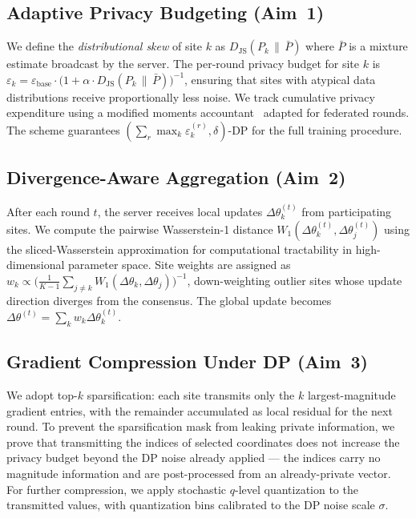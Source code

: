\documentclass[11pt,a4paper]{article}
\begin{document}
{\subsection{Adaptive Privacy Budgeting (Aim~1)}

We define the \emph{distributional skew} of site $k$ as
$D_{\mathrm{JS}}(P_k \,\|\, \bar{P})$ where $\bar{P}$ is a mixture estimate broadcast by the
server. The per-round privacy budget for site $k$ is
$\varepsilon_k = \varepsilon_{\mathrm{base}} \cdot \bigl(1 +
\alpha \cdot D_{\mathrm{JS}}(P_k \,\|\, \bar{P})\bigr)^{-1}$, ensuring that sites with
atypical data distributions receive proportionally less noise. We track cumulative privacy
expenditure using a modified moments accountant~\cite{abadi2016} adapted for federated
rounds. The scheme guarantees $(\sum_r \max_k \varepsilon_k^{(r)}, \delta)$-DP for the full
training procedure.

\subsection{Divergence-Aware Aggregation (Aim~2)}

After each round $t$, the server receives local updates $\Delta\theta_k^{(t)}$ from
participating sites. We compute the pairwise Wasserstein-1 distance
$W_1(\Delta\theta_k^{(t)}, \Delta\theta_j^{(t)})$ using the sliced-Wasserstein approximation
for computational tractability in high-dimensional parameter space. Site weights are
assigned as $w_k \propto \bigl(\frac{1}{K-1}\sum_{j \neq k} W_1(\Delta\theta_k,
\Delta\theta_j)\bigr)^{-1}$, down-weighting outlier sites whose update direction diverges
from the consensus. The global update becomes
$\Delta\theta^{(t)} = \sum_k w_k \Delta\theta_k^{(t)}$.

\subsection{Gradient Compression Under DP (Aim~3)}

We adopt top-$k$ sparsification: each site transmits only the $k$ largest-magnitude gradient
entries, with the remainder accumulated as local residual for the next round. To prevent
the sparsification mask from leaking private information, we prove that transmitting the
indices of selected coordinates does not increase the privacy budget beyond the DP noise
already applied — the indices carry no magnitude information and are post-processed from
an already-private vector. For further compression, we apply stochastic
$q$-level quantization to the transmitted values, with quantization bins calibrated to the
DP noise scale $\sigma$.

}
\end{document}
